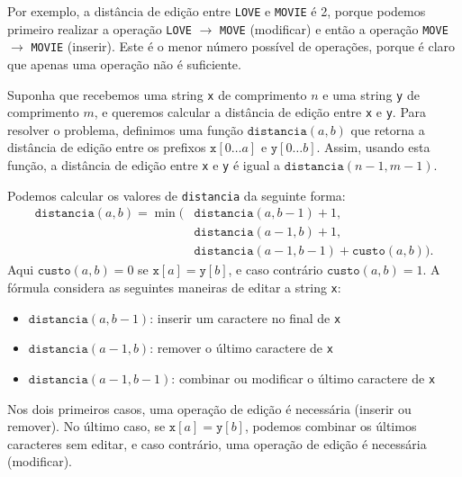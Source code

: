 Por exemplo, a distância de edição entre
\texttt{LOVE} e \texttt{MOVIE} é 2,
porque podemos primeiro realizar a operação
\texttt{LOVE} $\rightarrow$ \texttt{MOVE}
(modificar) e então a operação
\texttt{MOVE} $\rightarrow$ \texttt{MOVIE}
(inserir).
Este é o menor número possível de operações,
porque é claro que apenas uma operação não é suficiente.

Suponha que recebemos uma string \texttt{x}
de comprimento $n$ e uma string \texttt{y} de comprimento $m$,
e queremos calcular a distância de edição entre
\texttt{x} e \texttt{y}.
Para resolver o problema, definimos uma função
$\texttt{distancia}(a,b)$ que retorna a
distância de edição entre os prefixos
$\texttt{x}[0 \ldots a]$ e $\texttt{y}[0 \ldots b]$.
Assim, usando esta função, a distância de edição
entre \texttt{x} e \texttt{y} é igual a $\texttt{distancia}(n-1,m-1)$.

Podemos calcular os valores de \texttt{distancia}
da seguinte forma:
\begin{equation*}
\begin{split}
\texttt{distancia}(a,b) = \min(& \texttt{distancia}(a,b-1)+1, \\
                           & \texttt{distancia}(a-1,b)+1, \\
                           & \texttt{distancia}(a-1,b-1)+\texttt{custo}(a,b)).
\end{split}
\end{equation*}
Aqui $\texttt{custo}(a,b)=0$ se $\texttt{x}[a]=\texttt{y}[b]$,
e caso contrário $\texttt{custo}(a,b)=1$.
A fórmula considera as seguintes maneiras de
editar a string \texttt{x}:
\begin{itemize}
\item $\texttt{distancia}(a,b-1)$: inserir um caractere no final de \texttt{x}
\item $\texttt{distancia}(a-1,b)$: remover o último caractere de \texttt{x}
\item $\texttt{distancia}(a-1,b-1)$: combinar ou modificar o último caractere de \texttt{x}
\end{itemize}
Nos dois primeiros casos, uma operação de edição é necessária
(inserir ou remover).
No último caso, se $\texttt{x}[a]=\texttt{y}[b]$,
podemos combinar os últimos caracteres sem editar,
e caso contrário, uma operação de edição é necessária (modificar).

